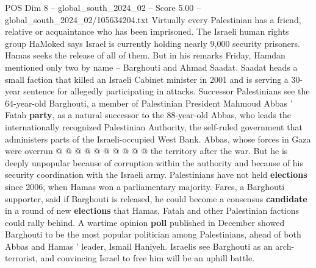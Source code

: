 \begin{textsample}{POS Dim 8 – global\_south\_2024\_02 – Score 5.00 – global\_south\_2024\_02/105634204.txt}
Virtually every Palestinian has a friend, relative or acquaintance who has been imprisoned.
The Israeli human rights group HaMoked says Israel is currently holding nearly 9,000 security prisoners.
Hamas seeks the release of all of them.
But in his remarks Friday, Hamdan mentioned only two by name -- Barghouti and Ahmad Saadat.
Saadat heads a small faction that killed an Israeli Cabinet minister in 2001 and is serving a 30-year sentence for allegedly participating in attacks.
Successor Palestinians see the 64-year-old Barghouti, a member of Palestinian President Mahmoud Abbas ' Fatah \textbf{party}, as a natural successor to the 88-year-old Abbas, who leads the internationally recognized Palestinian Authority, the self-ruled government that administers parts of the Israeli-occupied West Bank.
Abbas, whose forces in Gaza were overrun @ @ @ @ @ @ @ @ @ @ the territory after the war.
But he is deeply unpopular because of corruption within the authority and because of his security coordination with the Israeli army.
Palestinians have not held \textbf{elections} since 2006, when Hamas won a parliamentary majority.
Fares, a Barghouti supporter, said if Barghouti is released, he could become a consensus \textbf{candidate} in a round of new \textbf{elections} that Hamas, Fatah and other Palestinian factions could rally behind.
A wartime opinion \textbf{poll} published in December showed Barghouti to be the most popular politician among Palestinians, ahead of both Abbas and Hamas ' leader, Ismail Haniyeh.
Israelis see Barghouti as an arch-terrorist, and convincing Israel to free him will be an uphill battle.

\end{textsample}
